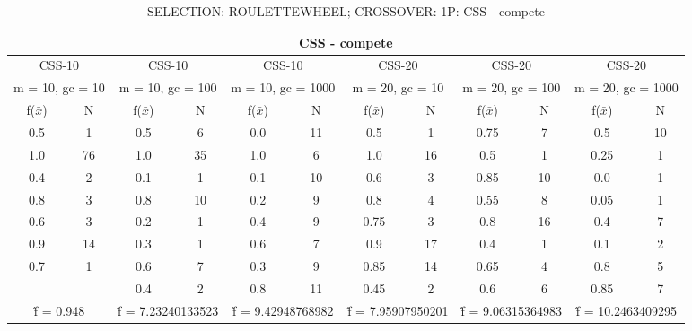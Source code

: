 \begin{table}[H]
	\centering
	\caption{SELECTION: ROULETTEWHEEL; CROSSOVER: 1P: CSS - compete}
	\begin{adjustbox}{width=1\textwidth}
		\begin{tabular}{ |c|c||c|c||c|c||c|c||c|c||c|c| }
			\hline
			\multicolumn{12}{|c|}{CSS - compete} \\
			\hline
			\multicolumn{2}{|c||}{CSS-10} & \multicolumn{2}{c||}{CSS-10} & \multicolumn{2}{c||}{CSS-10} & \multicolumn{2}{c||}{CSS-20} & \multicolumn{2}{c||}{CSS-20} & \multicolumn{2}{c|}{CSS-20}\\
			\hline
			\multicolumn{2}{|c||}{m = 10, gc = 10} & \multicolumn{2}{c||}{m = 10, gc = 100} & \multicolumn{2}{c||}{m = 10, gc = 1000} & \multicolumn{2}{c||}{m = 20, gc = 10} & \multicolumn{2}{c||}{m = 20, gc = 100} & \multicolumn{2}{c|}{m = 20, gc = 1000}\\
			\hline
			f($\bar{x}$) & N & f($\bar{x}$) & N & f($\bar{x}$) & N & f($\bar{x}$) & N & f($\bar{x}$) & N & f($\bar{x}$) & N\\
			\hline
			\hline
			0.5 & 1 & 0.5 & 6 & 0.0 & 11 & 0.5 & 1 & 0.75 & 7 & 0.5 & 10\\
			1.0 & 76 & 1.0 & 35 & 1.0 & 6 & 1.0 & 16 & 0.5 & 1 & 0.25 & 1\\
			0.4 & 2 & 0.1 & 1 & 0.1 & 10 & 0.6 & 3 & 0.85 & 10 & 0.0 & 1\\
			0.8 & 3 & 0.8 & 10 & 0.2 & 9 & 0.8 & 4 & 0.55 & 8 & 0.05 & 1\\
			0.6 & 3 & 0.2 & 1 & 0.4 & 9 & 0.75 & 3 & 0.8 & 16 & 0.4 & 7\\
			0.9 & 14 & 0.3 & 1 & 0.6 & 7 & 0.9 & 17 & 0.4 & 1 & 0.1 & 2\\
			0.7 & 1 & 0.6 & 7 & 0.3 & 9 & 0.85 & 14 & 0.65 & 4 & 0.8 & 5\\
			&   & 0.4 & 2 & 0.8 & 11 & 0.45 & 2 & 0.6 & 6 & 0.85 & 7\\
			\hline
			\multicolumn{2}{|c||}{\^{f} = 0.948} & \multicolumn{2}{c||}{\^{f} = 7.23240133523} & \multicolumn{2}{c||}{\^{f} = 9.42948768982} & \multicolumn{2}{c||}{\^{f} = 7.95907950201} & \multicolumn{2}{c||}{\^{f} = 9.06315364983} & \multicolumn{2}{c|}{\^{f} = 10.2463409295}\\
			\hline
		\end{tabular}
	\end{adjustbox}
\end{table}

